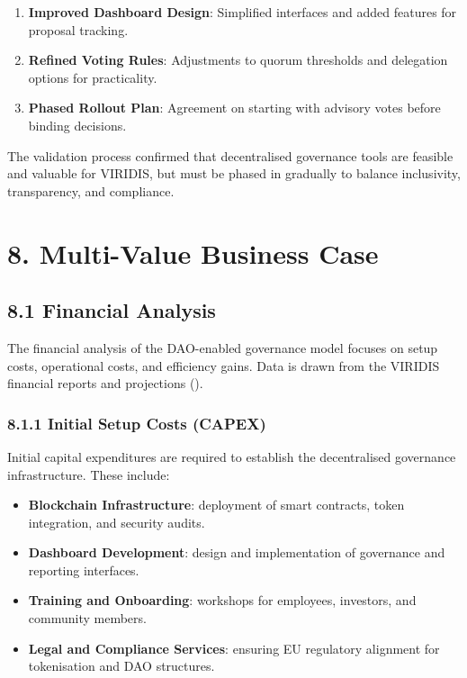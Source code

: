 \documentclass[
  english,
  12pt,
  oneside,
  open=any]{scrbook}
\providecommand{\tightlist}{%
  \setlength{\itemsep}{0pt}\setlength{\parskip}{0pt}}\usepackage{longtable,booktabs,array}
\begin{document}
\begin{enumerate}
\def\labelenumi{\arabic{enumi}.}
\tightlist
\item
  \textbf{Improved Dashboard Design}: Simplified interfaces and added
  features for proposal tracking.\\
\item
  \textbf{Refined Voting Rules}: Adjustments to quorum thresholds and
  delegation options for practicality.\\
\item
  \textbf{Phased Rollout Plan}: Agreement on starting with advisory
  votes before binding decisions.
\end{enumerate}

The validation process confirmed that decentralised governance tools are
feasible and valuable for VIRIDIS, but must be phased in gradually to
balance inclusivity, transparency, and compliance.

\chapter{8. Multi-Value Business Case}\label{sec-business-case}

\section{8.1 Financial Analysis}\label{sec-financial}

The financial analysis of the DAO-enabled governance model focuses on
setup costs, operational costs, and efficiency gains. Data is drawn from
the VIRIDIS financial reports and projections
().

\subsection{8.1.1 Initial Setup Costs (CAPEX)}\label{sec-capex}

Initial capital expenditures are required to establish the decentralised
governance infrastructure. These include:

\begin{itemize}
\tightlist
\item
  \textbf{Blockchain Infrastructure}: deployment of smart contracts,
  token integration, and security audits.\\
\item
  \textbf{Dashboard Development}: design and implementation of
  governance and reporting interfaces.\\
\item
  \textbf{Training and Onboarding}: workshops for employees, investors,
  and community members.\\
\item
  \textbf{Legal and Compliance Services}: ensuring EU regulatory
  alignment for tokenisation and DAO structures.
\end{itemize}
\end{document}
